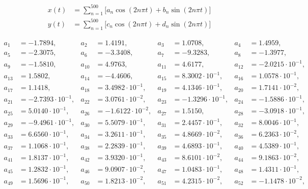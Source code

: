 \begin{align*}
x(t) &= \sum\limits_{n=1}^{ 500 } \Big[a_n \cos(2n\pi t) + b_n \sin(2n\pi t) \Big]\\ 
y(t) &= \sum\limits_{n=1}^{ 500 } \Big[c_n \cos(2n\pi t) + d_n \sin(2n\pi t) \Big]
\end{align*}

\begin{align*}
a_{ 1 } &= -1.7894, & a_{ 2 } &= 1.4191, & a_{ 3 } &= 1.0708, & a_{ 4 } &= 1.4959,\\ 
a_{ 5 } &= -2.3075, & a_{ 6 } &= -3.3408, & a_{ 7 } &= -9.3283, & a_{ 8 } &= -1.3977,\\ 
a_{ 9 } &= -1.5810, & a_{ 10 } &= 4.9763, & a_{ 11 } &= 4.6177, & a_{ 12 } &= -2.0215 \cdot 10^{ -1 },\\ 
a_{ 13 } &= 1.5802, & a_{ 14 } &= -4.4606, & a_{ 15 } &= 8.3002 \cdot 10^{ -1 }, & a_{ 16 } &= 1.0578 \cdot 10^{ -1 },\\ 
a_{ 17 } &= 1.1418, & a_{ 18 } &= 3.4982 \cdot 10^{ -1 }, & a_{ 19 } &= 4.1346 \cdot 10^{ -1 }, & a_{ 20 } &= 1.7141 \cdot 10^{ -2 },\\ 
a_{ 21 } &= -2.7393 \cdot 10^{ -1 }, & a_{ 22 } &= 3.0761 \cdot 10^{ -2 }, & a_{ 23 } &= -1.3296 \cdot 10^{ -1 }, & a_{ 24 } &= -1.5886 \cdot 10^{ -1 },\\ 
a_{ 25 } &= 5.0140 \cdot 10^{ -1 }, & a_{ 26 } &= -1.6122 \cdot 10^{ -2 }, & a_{ 27 } &= 1.5150, & a_{ 28 } &= -3.0918 \cdot 10^{ -1 },\\ 
a_{ 29 } &= -9.4961 \cdot 10^{ -1 }, & a_{ 30 } &= 5.5079 \cdot 10^{ -1 }, & a_{ 31 } &= 2.4457 \cdot 10^{ -1 }, & a_{ 32 } &= 8.0046 \cdot 10^{ -1 },\\ 
a_{ 33 } &= 6.6560 \cdot 10^{ -1 }, & a_{ 34 } &= 3.2611 \cdot 10^{ -1 }, & a_{ 35 } &= 4.8669 \cdot 10^{ -2 }, & a_{ 36 } &= 6.2363 \cdot 10^{ -2 },\\ 
a_{ 37 } &= 1.1068 \cdot 10^{ -1 }, & a_{ 38 } &= 2.2839 \cdot 10^{ -1 }, & a_{ 39 } &= 4.6893 \cdot 10^{ -1 }, & a_{ 40 } &= 4.5389 \cdot 10^{ -1 },\\ 
a_{ 41 } &= 1.8137 \cdot 10^{ -1 }, & a_{ 42 } &= 3.9320 \cdot 10^{ -1 }, & a_{ 43 } &= 8.6101 \cdot 10^{ -2 }, & a_{ 44 } &= 9.1863 \cdot 10^{ -2 },\\ 
a_{ 45 } &= 1.2832 \cdot 10^{ -1 }, & a_{ 46 } &= 9.0907 \cdot 10^{ -2 }, & a_{ 47 } &= 1.0483 \cdot 10^{ -1 }, & a_{ 48 } &= 1.4311 \cdot 10^{ -1 },\\ 
a_{ 49 } &= 1.5696 \cdot 10^{ -1 }, & a_{ 50 } &= 1.8213 \cdot 10^{ -2 }, & a_{ 51 } &= 4.2315 \cdot 10^{ -2 }, & a_{ 52 } &= -1.1478 \cdot 10^{ -2 },\\ 

\end{align*}

